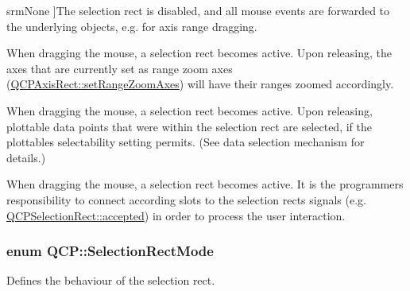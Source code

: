 \begin{Desc}
\begin{description}
{srm\+None\hypertarget{namespace_q_c_p_ac9aa4d6d81ac76b094f9af9ad2d3aacfa894e973fdf7efc6174a9de50babb19fd}{}\label{namespace_q_c_p_ac9aa4d6d81ac76b094f9af9ad2d3aacfa894e973fdf7efc6174a9de50babb19fd}
}]The selection rect is disabled, and all mouse events are forwarded to the underlying objects, e.\+g. for axis range dragging. \item[{\em 
srm\+Zoom\hypertarget{namespace_q_c_p_ac9aa4d6d81ac76b094f9af9ad2d3aacfaaadea13ba6846072eb23d5f182be0fe3}{}\label{namespace_q_c_p_ac9aa4d6d81ac76b094f9af9ad2d3aacfaaadea13ba6846072eb23d5f182be0fe3}
}]When dragging the mouse, a selection rect becomes active. Upon releasing, the axes that are currently set as range zoom axes (\hyperlink{class_q_c_p_axis_rect_a9442cca2aa358405f39a64d51eca13d2}{Q\+C\+P\+Axis\+Rect\+::set\+Range\+Zoom\+Axes}) will have their ranges zoomed accordingly. \item[{\em 
srm\+Select\hypertarget{namespace_q_c_p_ac9aa4d6d81ac76b094f9af9ad2d3aacfa590be33019df7ba5276a8457a5c769c1}{}\label{namespace_q_c_p_ac9aa4d6d81ac76b094f9af9ad2d3aacfa590be33019df7ba5276a8457a5c769c1}
}]When dragging the mouse, a selection rect becomes active. Upon releasing, plottable data points that were within the selection rect are selected, if the plottable\textquotesingle{}s selectability setting permits. (See data selection mechanism for details.) \item[{\em 
srm\+Custom\hypertarget{namespace_q_c_p_ac9aa4d6d81ac76b094f9af9ad2d3aacfa88e34810ad5d2866d3857db386cbb442}{}\label{namespace_q_c_p_ac9aa4d6d81ac76b094f9af9ad2d3aacfa88e34810ad5d2866d3857db386cbb442}
}]When dragging the mouse, a selection rect becomes active. It is the programmer\textquotesingle{}s responsibility to connect according slots to the selection rect\textquotesingle{}s signals (e.\+g. \hyperlink{class_q_c_p_selection_rect_a15a43542e1f7b953a44c260b419e6d2c}{Q\+C\+P\+Selection\+Rect\+::accepted}) in order to process the user interaction. \end{description}
\end{Desc}
\subsubsection[{\texorpdfstring{Selection\+Rect\+Mode}{SelectionRectMode}}]{\setlength{\rightskip}{0pt plus 5cm}enum {\bf Q\+C\+P\+::\+Selection\+Rect\+Mode}}\hypertarget{namespace_q_c_p_ac9aa4d6d81ac76b094f9af9ad2d3aacf}{}\label{namespace_q_c_p_ac9aa4d6d81ac76b094f9af9ad2d3aacf}
Defines the behaviour of the selection rect.

